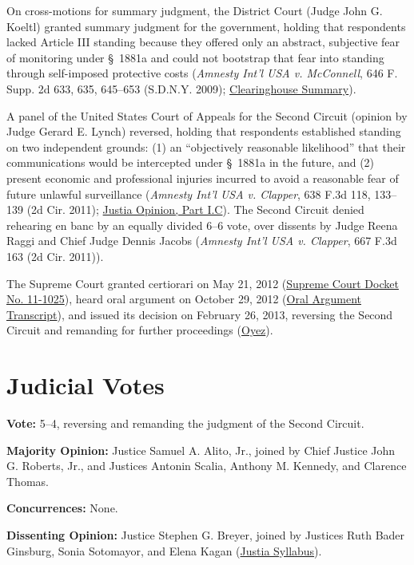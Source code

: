 \documentclass[12pt]{article}
\begin{document}
On cross-motions for summary judgment, the District Court (Judge John G. Koeltl) granted summary judgment for the government, holding that respondents lacked Article III standing because they offered only an abstract, subjective fear of monitoring under \S~1881a and could not bootstrap that fear into standing through self-imposed protective costs (\textit{Amnesty Int'l USA v. McConnell}, 646 F. Supp. 2d 633, 635, 645--653 (S.D.N.Y. 2009); \href{https://clearinghouse.net/case/12972/}{Clearinghouse Summary}).

A panel of the United States Court of Appeals for the Second Circuit (opinion by Judge Gerard E. Lynch) reversed, holding that respondents established standing on two independent grounds: (1) an ``objectively reasonable likelihood'' that their communications would be intercepted under \S~1881a in the future, and (2) present economic and professional injuries incurred to avoid a reasonable fear of future unlawful surveillance (\textit{Amnesty Int'l USA v. Clapper}, 638 F.3d 118, 133--139 (2d Cir. 2011); \href{https://supreme.justia.com/cases/federal/us/568/398/}{Justia Opinion, Part I.C}). The Second Circuit denied rehearing en banc by an equally divided 6--6 vote, over dissents by Judge Reena Raggi and Chief Judge Dennis Jacobs (\textit{Amnesty Int'l USA v. Clapper}, 667 F.3d 163 (2d Cir. 2011)).

The Supreme Court granted certiorari on May 21, 2012 (\href{https://www.supremecourt.gov/docketfiles/11-1025.htm}{Supreme Court Docket No. 11-1025}), heard oral argument on October 29, 2012 (\href{https://www.supremecourt.gov/oral_arguments/argument_transcripts/2012/11-1025.pdf}{Oral Argument Transcript}), and issued its decision on February 26, 2013, reversing the Second Circuit and remanding for further proceedings (\href{https://www.oyez.org/cases/2012/11-1025}{Oyez}).

\section{Judicial Votes}

\textbf{Vote:} 5--4, reversing and remanding the judgment of the Second Circuit.

\textbf{Majority Opinion:} Justice Samuel A. Alito, Jr., joined by Chief Justice John G. Roberts, Jr., and Justices Antonin Scalia, Anthony M. Kennedy, and Clarence Thomas.

\textbf{Concurrences:} None.

\textbf{Dissenting Opinion:} Justice Stephen G. Breyer, joined by Justices Ruth Bader Ginsburg, Sonia Sotomayor, and Elena Kagan (\href{https://supreme.justia.com/cases/federal/us/568/398/}{Justia Syllabus}).
\end{document}
